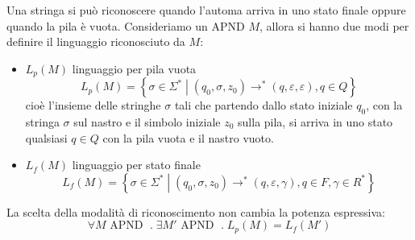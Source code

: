 \documentclass[a4paper]{article}
\begin{document}
\begin{definition}
  Una stringa si può riconoscere quando l'automa arriva in uno stato finale oppure
  quando la pila è vuota. Consideriamo un APND \( M \), allora si hanno due modi
  per definire il linguaggio riconosciuto da \( M \):
  \begin{itemize}
    \item \( L_p(M) \) linguaggio per pila vuota
      \[
        L_p(M) = \left\{ \sigma \in \Sigma^* \;\left|\; \left( q_0, \sigma, z_0 \right)
      \to^* \left( q, \varepsilon, \varepsilon \right), q \in Q \right. \right\}
      \] 
      cioè l'insieme delle stringhe \( \sigma \) tali che partendo dallo stato
      iniziale \( q_0 \), con la stringa \( \sigma \) sul nastro e il simbolo iniziale
      \( z_0 \) sulla pila, si arriva in uno stato qualsiasi \( q \in Q \) con
      la pila vuota e il nastro vuoto.
    \item \( L_f(M) \) linguaggio per stato finale
      \[
        L_f(M) = \left\{ \sigma \in \Sigma^* \;\left|\; \left( q_0, \sigma, z_0 \right)
      \to^* \left( q, \varepsilon, \gamma \right), q \in F, \gamma \in R^* \right. \right\}
      \] 
  \end{itemize}
  La scelta della modalità di riconoscimento non cambia la potenza espressiva:
  \[
    \forall M \text{ APND } \;.\; \exists M' \text{ APND } \;.\;
    L_p(M) = L_f(M')
  \] 
\end{definition}
\end{document}
